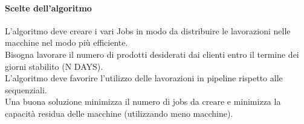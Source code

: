 \paragraph{Scelte dell'algoritmo}
L'algoritmo deve creare i vari Jobs in modo da distribuire le lavorazioni nelle macchine nel modo più efficiente.\\
Bisogna lavorare il numero di prodotti desiderati dai clienti entro il termine dei giorni stabilito (N DAYS).\\
L'algoritmo deve favorire l'utilizzo delle lavorazioni in pipeline rispetto alle sequenziali.\\
Una buona soluzione minimizza il numero di jobs da creare e minimizza la capacità residua delle macchine (utilizzando meno macchine).